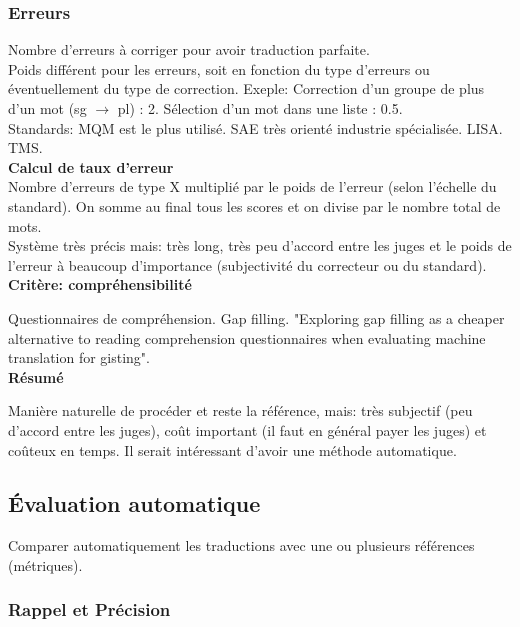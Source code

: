 \subsubsection{Erreurs}

Nombre d’erreurs à corriger pour avoir traduction parfaite.\\

Poids différent pour les erreurs, soit en fonction du type d’erreurs ou éventuellement du type de correction.
Exeple: Correction d’un groupe de plus d’un mot (sg $\rightarrow$ pl) : 2. Sélection d’un mot dans une liste : 0.5. \\

Standards: MQM est le plus utilisé. SAE très orienté industrie spécialisée. LISA. TMS. \\

\textbf{Calcul de taux d'erreur} \\

Nombre d'erreurs de type X multiplié par le poids de l'erreur (selon l'échelle du standard). On somme au final tous les scores et on divise par le nombre total de mots. \\

Système très précis mais: très long, très peu d'accord entre les juges et le poids de l'erreur à beaucoup d'importance (subjectivité du correcteur ou du standard).\\


\textbf{Critère: compréhensibilité}

Questionnaires de compréhension. Gap filling. "Exploring gap filling as a cheaper alternative to reading comprehension questionnaires when evaluating machine translation for gisting".\\

\textbf{Résumé}

Manière naturelle de procéder et reste la référence, mais: très subjectif (peu d'accord entre les juges), coût important (il faut en général payer les juges) et coûteux en temps. Il serait intéressant d'avoir une méthode automatique.

\subsection{Évaluation automatique}

Comparer automatiquement les traductions avec une ou plusieurs références (métriques).

\subsubsection{Rappel et Précision}

